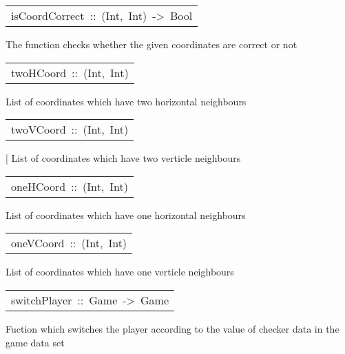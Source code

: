 \begin{haddockdesc}
\item[\begin{tabular}{@{}l}
isCoordCorrect\ ::\ (Int,\ Int)\ ->\ Bool
\end{tabular}]\haddockbegindoc
The  function checks whether the given coordinates are correct or not\par

\end{haddockdesc}
\begin{haddockdesc}
\item[\begin{tabular}{@{}l}
twoHCoord\ ::\ {\char 91}(Int,\ Int){\char 93}
\end{tabular}]\haddockbegindoc
{}
 List of coordinates which have two horizontal neighbours\par

\end{haddockdesc}
\begin{haddockdesc}
\item[\begin{tabular}{@{}l}
twoVCoord\ ::\ {\char 91}(Int,\ Int){\char 93}
\end{tabular}]\haddockbegindoc
{}
 | List of coordinates which have two verticle neighbours\par

\end{haddockdesc}
\begin{haddockdesc}
\item[\begin{tabular}{@{}l}
oneHCoord\ ::\ {\char 91}(Int,\ Int){\char 93}
\end{tabular}]\haddockbegindoc
{}
 List of coordinates which have one horizontal neighbours\par

\end{haddockdesc}
\begin{haddockdesc}
\item[\begin{tabular}{@{}l}
oneVCoord\ ::\ {\char 91}(Int,\ Int){\char 93}
\end{tabular}]\haddockbegindoc
{}
 List of coordinates which have one verticle neighbours\par

\end{haddockdesc}
\begin{haddockdesc}
\item[\begin{tabular}{@{}l}
switchPlayer\ ::\ Game\ ->\ Game
\end{tabular}]\haddockbegindoc
{}
 Fuction which switches the player according to the value of checker data in the game data set\par

\end{haddockdesc}
